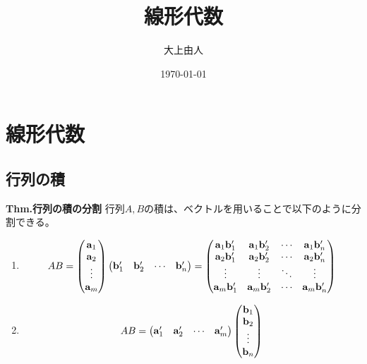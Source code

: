 \documentclass[a4paper,11pt]{jsarticle}
\numberwithin{equation}{section}
\begin{document}
\title{線形代数}
\author{大上由人}
\date{\today}
\maketitle


\section{線形代数}
\subsection{行列の積}
\begin{itembox}[l]{\textbf{Thm.行列の積の分割}}
  行列$A,B$の積は、ベクトルを用いることで以下のように分割できる。
  \begin{enumerate}
    \item 
    \begin{align}
      AB = \begin{pmatrix}
        \vb{a}_1\\
        \vb{a}_2\\
        \vdots\\
        \vb{a}_m
      \end{pmatrix}
      \begin{pmatrix}
        \vb{b}'_1 & \vb{b}'_2 & \cdots & \vb{b}'_n
      \end{pmatrix}
      =
      \begin{pmatrix}
        \vb{a}_1 \vb{b}'_1 & \vb{a}_1 \vb{b}'_2 & \cdots & \vb{a}_1 \vb{b}'_n\\
        \vb{a}_2 \vb{b}'_1 & \vb{a}_2 \vb{b}'_2 & \cdots & \vb{a}_2 \vb{b}'_n\\
        \vdots & \vdots & \ddots & \vdots\\
        \vb{a}_m \vb{b}'_1 & \vb{a}_m \vb{b}'_2 & \cdots & \vb{a}_m \vb{b}'_n
      \end{pmatrix}
    \end{align}
  \item 
  \begin{align}
    AB = \begin{pmatrix}
      \vb{a}'_1 & \vb{a}'_2 & \cdots & \vb{a}'_m
    \end{pmatrix}
    \begin{pmatrix}
      \vb{b}_1\\
      \vb{b}_2\\
      \vdots\\
      \vb{b}_n
    \end{pmatrix}  

\end{align}
\end{enumerate}
\end{itembox}
\end{document}
